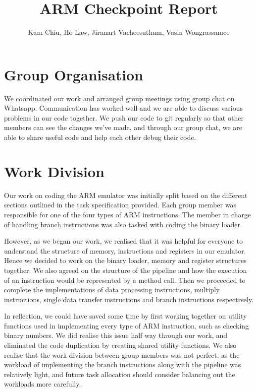 \documentclass[11pt]{article}
\begin{document}
\title{ARM Checkpoint Report}
\author{Kam Chiu, Ho Law, Jiranart Vacheesuthum, Vasin Wongrassamee}

\maketitle

\section{Group Organisation}

We coordinated our work and arranged group meetings using group chat on Whatsapp. Communication has worked well and we are able to discuss various problems in our code together. We push our code to git regularly so that other members can see the changes we've made, and through our group chat, we are able to share useful code and help each other debug their code.

\section{Work Division}

Our work on coding the ARM emulator was initially split based on the different sections outlined in the task specification provided. Each group member was responsible for one of the four types of ARM instructions. The member in charge of handling branch instructions was also tasked with coding the binary loader. 

\medskip

However, as we began our work, we realised that it was helpful for everyone to understand the structure of memory, instructions and registers in our emulator. Hence we decided to work on the binary loader, memory and register structures together. We also agreed on the structure of the pipeline and how the execution of an instruction would be represented by a method call. Then we proceeded to complete the implementations of data processing instructions, multiply instructions, single data transfer instructions and branch instructions respectively. 

\medskip

In reflection, we could have saved some time by first working together on utility functions used in implementing every type of ARM instruction, such as checking binary numbers. We did realise this issue half way through our work, and eliminated the code duplication by creating shared utility functions. We also realise that the work division between group members was not perfect, as the workload of implementing the branch instructions along with the pipeline was relatively light, and future task allocation should consider balancing out the workloads more carefully. 
\end{document}
